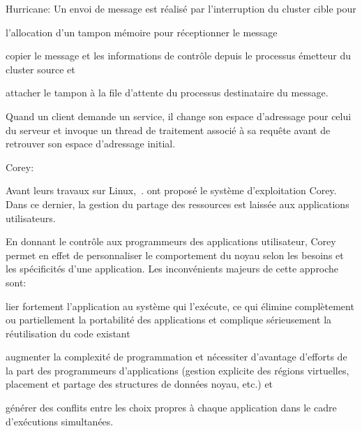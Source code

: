 \begin{paragraph}{Hurricane:}
        Un envoi de message est réalisé par l’interruption du cluster cible
        pour\benumline \item l’allocation d’un tampon mémoire pour réceptionner
        le message \item copier le message et les informations de contrôle
        depuis le processus émetteur du cluster source et \item attacher le
        tampon à la file d’attente du processus destinataire du
        message\eenumline.

        Quand un client demande un service, il change son espace d’adressage
        pour celui du serveur et invoque un thread de traitement associé à sa
        requête avant de retrouver son espace d’adressage initial.

      \end{paragraph}
      
      \begin{paragraph}{Corey:}

        Avant leurs travaux sur Linux,~\citet{boyd2008corey}. ont proposé le
        système d’exploitation Corey. Dans ce dernier, la gestion du partage des
        ressources est laissée aux applications utilisateurs.

        En donnant le contrôle aux programmeurs des applications utilisateur,
        Corey permet en effet de personnaliser le comportement du noyau selon
        les besoins et les spécificités d’une application. Les inconvénients
        majeurs de cette approche sont: \benumline \item lier fortement
        l’application au système qui l’exécute, ce qui élimine complètement ou
        partiellement la portabilité des applications et complique sérieusement
        la réutilisation du code existant \item augmenter la complexité de
        programmation et nécessiter d’avantage d’efforts de la part des
        programmeurs d’applications (gestion explicite des régions virtuelles,
        placement et partage des structures de données noyau, etc.) et \item
        générer des conflits entre les choix propres à chaque application dans
        le cadre d'exécutions simultanées\eenumline.

      \end{paragraph}

